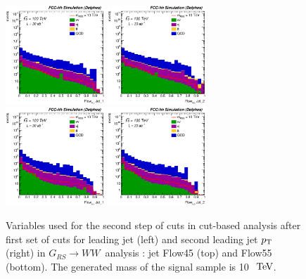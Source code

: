 \documentclass{cernrep}
\newcommand*{\rsg}{\ensuremath{G_{RS} \rightarrow WW}}
\begin{document}
\begin{figure}[!htb]\centering
\includegraphics[width=0.33\textwidth]{Fig/RSGww/Jet1_Flow45_sel1_nostack_log.eps}
\includegraphics[width=0.33\textwidth]{Fig/RSGww/Jet2_Flow45_sel1_nostack_log.eps}
\includegraphics[width=0.33\textwidth]{Fig/RSGww/Jet1_Flow55_sel1_nostack_log.eps}
\includegraphics[width=0.33\textwidth]{Fig/RSGww/Jet2_Flow55_sel1_nostack_log.eps}
\caption{Variables used for the second step of cuts in cut-based analysis after first set of cuts for leading jet (left) and second leading jet $p\sb{\scriptstyle\mathrm{T}}$ (right) in \rsg\ analysis : jet Flow45 (top) and Flow55 (bottom). The generated mass of the signal sample is 10 $\TeV$.}
\label{fig:RSGww_sel1_cut}
\end{figure}
\end{document}

